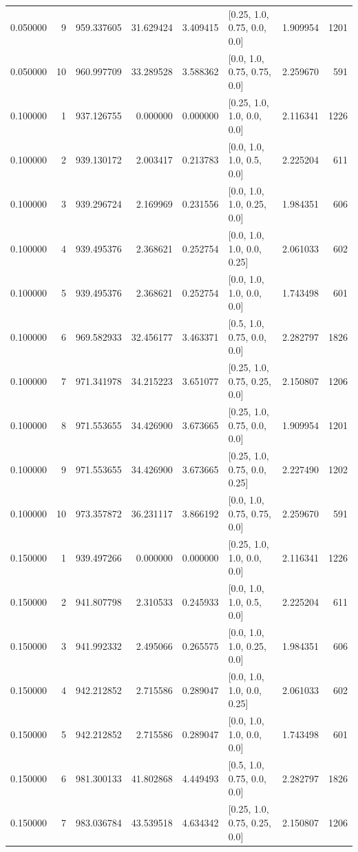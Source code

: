 \begin{tabular}{rrrrrlrr}
0.050000 & 9 & 959.337605 & 31.629424 & 3.409415 & [0.25, 1.0, 0.75, 0.0, 0.0] & 1.909954 & 1201 \\
0.050000 & 10 & 960.997709 & 33.289528 & 3.588362 & [0.0, 1.0, 0.75, 0.75, 0.0] & 2.259670 & 591 \\
0.100000 & 1 & 937.126755 & 0.000000 & 0.000000 & [0.25, 1.0, 1.0, 0.0, 0.0] & 2.116341 & 1226 \\
0.100000 & 2 & 939.130172 & 2.003417 & 0.213783 & [0.0, 1.0, 1.0, 0.5, 0.0] & 2.225204 & 611 \\
0.100000 & 3 & 939.296724 & 2.169969 & 0.231556 & [0.0, 1.0, 1.0, 0.25, 0.0] & 1.984351 & 606 \\
0.100000 & 4 & 939.495376 & 2.368621 & 0.252754 & [0.0, 1.0, 1.0, 0.0, 0.25] & 2.061033 & 602 \\
0.100000 & 5 & 939.495376 & 2.368621 & 0.252754 & [0.0, 1.0, 1.0, 0.0, 0.0] & 1.743498 & 601 \\
0.100000 & 6 & 969.582933 & 32.456177 & 3.463371 & [0.5, 1.0, 0.75, 0.0, 0.0] & 2.282797 & 1826 \\
0.100000 & 7 & 971.341978 & 34.215223 & 3.651077 & [0.25, 1.0, 0.75, 0.25, 0.0] & 2.150807 & 1206 \\
0.100000 & 8 & 971.553655 & 34.426900 & 3.673665 & [0.25, 1.0, 0.75, 0.0, 0.0] & 1.909954 & 1201 \\
0.100000 & 9 & 971.553655 & 34.426900 & 3.673665 & [0.25, 1.0, 0.75, 0.0, 0.25] & 2.227490 & 1202 \\
0.100000 & 10 & 973.357872 & 36.231117 & 3.866192 & [0.0, 1.0, 0.75, 0.75, 0.0] & 2.259670 & 591 \\
0.150000 & 1 & 939.497266 & 0.000000 & 0.000000 & [0.25, 1.0, 1.0, 0.0, 0.0] & 2.116341 & 1226 \\
0.150000 & 2 & 941.807798 & 2.310533 & 0.245933 & [0.0, 1.0, 1.0, 0.5, 0.0] & 2.225204 & 611 \\
0.150000 & 3 & 941.992332 & 2.495066 & 0.265575 & [0.0, 1.0, 1.0, 0.25, 0.0] & 1.984351 & 606 \\
0.150000 & 4 & 942.212852 & 2.715586 & 0.289047 & [0.0, 1.0, 1.0, 0.0, 0.25] & 2.061033 & 602 \\
0.150000 & 5 & 942.212852 & 2.715586 & 0.289047 & [0.0, 1.0, 1.0, 0.0, 0.0] & 1.743498 & 601 \\
0.150000 & 6 & 981.300133 & 41.802868 & 4.449493 & [0.5, 1.0, 0.75, 0.0, 0.0] & 2.282797 & 1826 \\
0.150000 & 7 & 983.036784 & 43.539518 & 4.634342 & [0.25, 1.0, 0.75, 0.25, 0.0] & 2.150807 & 1206 \\

\end{tabular}

